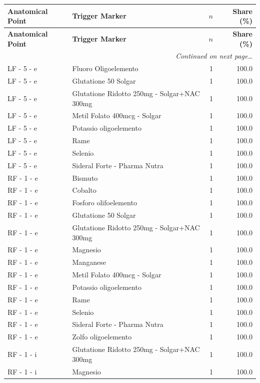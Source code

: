 \documentclass[a4paper,11pt]{article}
\begin{document}
\begin{footnotesize}
\begin{longtable}{p{3.5cm}p{7.5cm}rr}
\toprule
\textbf{Anatomical Point} &
\textbf{Trigger Marker} &
\textbf{$n$} &
\textbf{Share (\%)} \\
\midrule
\endfirsthead
\toprule
\textbf{Anatomical Point} &
\textbf{Trigger Marker} &
\textbf{$n$} &
\textbf{Share (\%)} \\
\midrule
\endhead
\midrule
\multicolumn{4}{r}{\footnotesize\emph{Continued on next page\ldots}} \\
\endfoot
\bottomrule
\endlastfoot
LF - 5 - e & Fluoro Oligoelemento & 1 & 100.0 \\
LF - 5 - e & Glutatione 50 Solgar & 1 & 100.0 \\
LF - 5 - e & Glutatione Ridotto 250mg - Solgar+NAC 300mg & 1 & 100.0 \\
LF - 5 - e & Metil Folato 400mcg - Solgar & 1 & 100.0 \\
LF - 5 - e & Potassio oligoelemento & 1 & 100.0 \\
LF - 5 - e & Rame & 1 & 100.0 \\
LF - 5 - e & Selenio & 1 & 100.0 \\
LF - 5 - e & Sideral Forte - Pharma Nutra & 1 & 100.0 \\
RF - 1 - e & Bismuto & 1 & 100.0 \\
RF - 1 - e & Cobalto & 1 & 100.0 \\
RF - 1 - e & Fosforo olifoelemento & 1 & 100.0 \\
RF - 1 - e & Glutatione 50 Solgar & 1 & 100.0 \\
RF - 1 - e & Glutatione Ridotto 250mg - Solgar+NAC 300mg & 1 & 100.0 \\
RF - 1 - e & Magnesio & 1 & 100.0 \\
RF - 1 - e & Manganese & 1 & 100.0 \\
RF - 1 - e & Metil Folato 400mcg - Solgar & 1 & 100.0 \\
RF - 1 - e & Potassio oligoelemento & 1 & 100.0 \\
RF - 1 - e & Rame & 1 & 100.0 \\
RF - 1 - e & Selenio & 1 & 100.0 \\
RF - 1 - e & Sideral Forte - Pharma Nutra & 1 & 100.0 \\
RF - 1 - e & Zolfo oligoelemento & 1 & 100.0 \\
RF - 1 - i & Glutatione Ridotto 250mg - Solgar+NAC 300mg & 1 & 100.0 \\
RF - 1 - i & Magnesio & 1 & 100.0 \\

\end{longtable}
\end{footnotesize}
\end{document}
